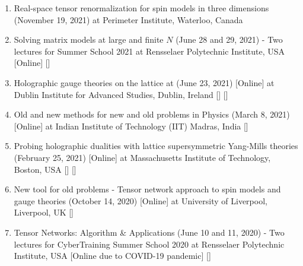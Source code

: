 \begin{enumerate}
  \item Real-space tensor renormalization for spin models in three dimensions 
 (November 19, 2021) at Perimeter Institute, Waterloo, Canada \vspace{1mm}  
 
 \item Solving matrix models at large and finite $N$ (June 28 and 29, 2021) - Two lectures for 
Summer School 2021 at Rensselaer Polytechnic Institute, USA [Online]  
  [] \vspace{1mm} 
 
 \item Holographic gauge theories on the lattice at 
 (June 23, 2021) [Online] at Dublin Institute for Advanced Studies, Dublin, Ireland 
  []  [] 
  \vspace{1mm} 
  
 \item Old and new methods for new and old problems in Physics
 (March 8, 2021) [Online] at Indian Institute of Technology (IIT) Madras, India
  [] 
\vspace{1mm} 
 
 \item Probing holographic dualities with lattice supersymmetric Yang-Mills theories 
 (February 25, 2021) [Online] at Massachusetts Institute of Technology, Boston, USA 
   []  [] 
 \vspace{1mm} 
 
 \item New tool for old problems - Tensor network approach to spin models and gauge theories 
 (October 14, 2020) [Online] at University of Liverpool, Liverpool, UK
  [] 
 \vspace{1mm} 
  
 \item Tensor Networks: Algorithm \& Applications (June 10 and 11, 2020) - Two lectures for 
 CyberTraining Summer School 2020 at Rensselaer Polytechnic Institute, USA [Online due to COVID-19 pandemic]  
   []  
\vspace{1mm} 


\end{enumerate}
